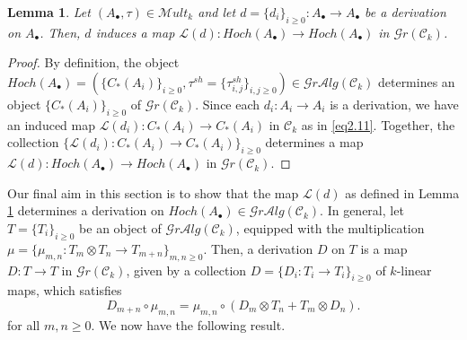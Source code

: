 \documentclass[10pt, colorlinks]{article}
\numberwithin{equation}{section} \DeclareMathSizes{2}{10}{12}{13}
\newtheorem{lem}[thm]{Lemma}
\begin{document}
	\begin{lem}\label{GR}
	    Let $({A}_\bullet,\tau)\in \mathscr Mult_k$  and let $d=\{d_i\}_{i\geq 0}:{A}_\bullet\longrightarrow {A}_\bullet$ be a derivation on ${A}_\bullet$. Then, $d$ induces a map $\mathscr{L}(d):Hoch({A}_\bullet)\longrightarrow Hoch(A_\bullet)$ in $\mathscr Gr (\mathcal C_k)$.
	\end{lem}
    \begin{proof}
         By definition, the object $Hoch(A_\bullet)=(\{C_*(A_i)\}_{i\geq0},\tau^{sh}=\{\tau^{sh}_{i,j}\}_{i,j\geq 0})\in \mathscr Gr\mathcal Alg(\mathcal C_k)$ determines an object $\{C_*(A_i)\}_{i\geq 0}$ of $\mathscr Gr (\mathcal C_k)$. Since each 
         $d_i:A_i\longrightarrow A_i$ is a derivation, we have an induced map $\mathscr{L}({d_i}):C_*(A_i)\longrightarrow C_*(A_i)$ in $\mathcal C_k$  as in \eqref{eq2.11}. Together, the collection  $\{\mathscr{L}({d_i}):C_*(A_i)\longrightarrow C_*(A_i)\}_{i\geq 0}$ determines a map $\mathscr{L}(d):Hoch({A}_\bullet)\longrightarrow Hoch(A_\bullet)$ in $\mathscr Gr (\mathcal C_k)$.
        
    \end{proof}
    \smallskip
    
     Our final aim in this section is to show that the map $\mathscr{L}({d})$ as defined in Lemma \ref{GR} determines a derivation on $Hoch(A_\bullet)\in \mathscr Gr\mathcal Alg(\mathcal C_k)$.  In general, let $T=\{T_i\}_{i\geq 0}$ be an object of $ \mathscr Gr\mathcal Alg(\mathcal C_k)$, equipped with the multiplication $\mu=\{\mu_{m,n}:T_m\otimes T_n\longrightarrow T_{m+n}\}_{m,n\geq 0}$. Then, a derivation $D$ on $T$ is a map $D:T\longrightarrow T$ in $\mathscr Gr (\mathcal C_k)$, given by a collection $D=\{D_{i}:T_i\longrightarrow T_i\}_{i\geq 0}$ of $k$-linear maps, which satisfies 
        \begin{equation}\label{2/11c}
            D_{m+n}\circ\mu_{m,n}=\mu_{m,n}\circ (D_{m}\otimes T_n+T_m\otimes D_n).
        \end{equation}
    for all $m,n\geq 0$. We now have the following result.
  
\end{document}
